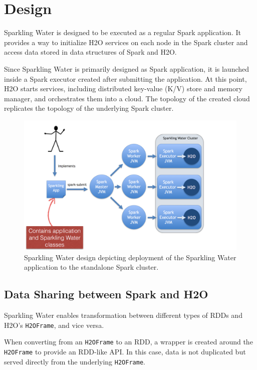 \documentclass{standalone}
\begin{document}
\section{Design}
Sparkling Water is designed to be executed as a regular Spark application. It provides a way to initialize H2O services on each node in the Spark cluster and access data stored in data structures of Spark and H2O.

Since Sparkling Water is primarily designed as Spark application, it is launched
inside a Spark executor created after submitting the application. At this
point, H2O starts services, including distributed key-value (K/V) store and memory manager, and orchestrates them into a cloud. The topology of the created cloud replicates the topology of the underlying Spark cluster.

\begin{figure}[h!]
	\centering
	\includegraphics[scale=0.6]{sw/images/Topology.png}
	\caption{Sparkling Water design depicting deployment of the Sparkling Water application to the standalone Spark cluster.}
\end{figure}


\subsection{Data Sharing between Spark and H2O}

Sparkling Water enables transformation between different types of RDDs and H2O's \texttt{H2OFrame}, and vice versa.

When converting from an \texttt{H2OFrame} to an RDD, a wrapper is created around the \texttt{H2OFrame} to provide an RDD-like API. In this case,  data is not duplicated but served directly from the underlying \texttt{H2OFrame}.
\end{document}
